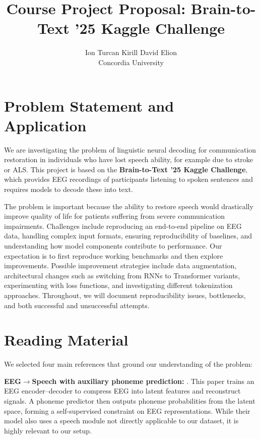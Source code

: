 \documentclass[10pt,twocolumn,letterpaper]{article}
\title{Course Project Proposal: Brain-to-Text '25 Kaggle Challenge}
\author{
Ion Turcan \quad Kirill \quad David \quad Elion\\
Concordia University
}
\begin{document}
\maketitle
\thispagestyle{empty}


\section{Problem Statement and Application}
We are investigating the problem of linguistic neural decoding for communication restoration in individuals who have lost speech ability, for example due to stroke or ALS. This project is based on the \textbf{Brain-to-Text '25 Kaggle Challenge}, which provides EEG recordings of participants listening to spoken sentences and requires models to decode these into text.

The problem is important because the ability to restore speech would drastically improve quality of life for patients suffering from severe communication impairments. Challenges include reproducing an end-to-end pipeline on EEG data, handling complex input formats, ensuring reproducibility of baselines, and understanding how model components contribute to performance. Our expectation is to first reproduce working benchmarks and then explore improvements. Possible improvement strategies include data augmentation, architectural changes such as switching from RNNs to Transformer variants, experimenting with loss functions, and investigating different tokenization approaches. Throughout, we will document reproducibility issues, bottlenecks, and both successful and unsuccessful attempts.

\section{Reading Material}
We selected four main references that ground our understanding of the problem:

\textbf{EEG$\to$Speech with auxiliary phoneme prediction:} \cite{lee_enhancing_2025}.  
This paper trains an EEG encoder--decoder to compress EEG into latent features and reconstruct signals. A phoneme predictor then outputs phoneme probabilities from the latent space, forming a self-supervised constraint on EEG representations. While their model also uses a speech module not directly applicable to our dataset, it is highly relevant to our setup.
\end{document}
